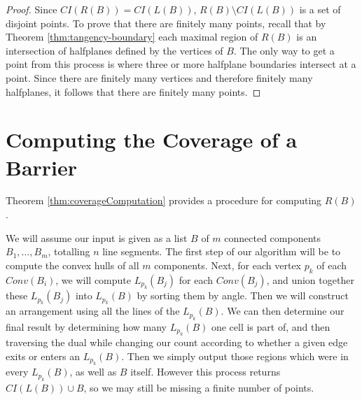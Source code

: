 \documentclass{cccg12}
\begin{document}
\begin{proof}
Since $CI(R(B)) = CI(L(B))$, $R(B)\setminus CI(L(B))$ is a set of disjoint points. To prove that there are finitely many points, recall that by Theorem \ref{thm:tangency-boundary} each maximal region of $R(B)$ is an intersection of halfplanes defined by the vertices of $B$. The only way to get a point from this process is where three or more halfplane boundaries intersect at a point. Since there are finitely many vertices and therefore finitely many halfplanes, it follows that there are finitely many points. 
\end{proof}

\begin{comment}It may seem that excluding the degenerate case of collinearity with a line segment served only to complicate things, but it was necessary to get a correct result. For instance, consider a barrier that is a series of collinear line segments. Using a more naive approach we would get the coverage to be the line all of these segments lie on. This is clearly not correct. Further, excluding these lines does not remove any information because the coverage and barrier are closed sets. It is impossible to have a gap in the coverage that can be plugged by the ``width" of exactly one line. Either there is no gap, or infinitely many lines can fit in the gap.
\end{comment}


\section{Computing the Coverage of a Barrier}

Theorem \ref{thm:coverageComputation} provides a procedure for computing $R(B)$.

We will assume our input is given as a list $B$ of $m$ connected components $B_1, \dots, B_m$, totalling $n$ line segments. The first step of our algorithm will be to compute the convex hulls of all $m$ components. Next, for each vertex $p_k$ of each $Conv(B_i)$, we will compute $L_{p_k}(B_j)$ for each $Conv(B_j)$, and union together these $L_{p_k}(B_j)$ into $L_{p_k}(B)$ by sorting them by angle. Then we will construct an arrangement using all the lines of the $L_{p_k}(B)$. We can then determine our final result by determining how many $L_{p_k}(B)$ one cell is part of, and then traversing the dual while changing our count according to whether a given edge exits or enters an $L_{p_k}(B)$. Then we simply output those regions which were in every $L_{p_k}(B)$, as well as $B$ itself. However this process returns $CI(L(B)) \cup B$, so we may still be missing a finite number of points.
\end{document}
